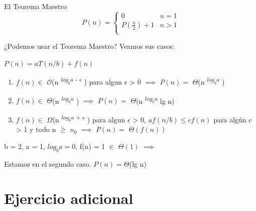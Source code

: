 \documentclass[pdf]{beamer}
\begin{document}
\begin{frame}{El Teorema Maestro}
\[ P(n) =  \begin{cases} 
    0 & n = 1 \\
    P(\frac{n}{2}) + 1 & n > 1 \\ 
   \end{cases}
 \]

 ¿Podemos usar el Teorema Maestro? Veamos sus casos:
 
 \pause
 
 \vspace{0.5em}
 
 \par{$P(n) = aT(n/b) + f(n)$}
 
 \vspace{0.5em}
 

 \begin{enumerate}
 
 [circle]
    \item $f(n) \in $  $\mathcal{O}$(n \textsuperscript{$log_b{a} $ - \(\epsilon\)  })  para algun \(\epsilon\) > 0 $\implies$ $P(n) =$ $\Theta$(n \textsuperscript{$log_b{a} $ })
    \item $f(n) \in $  $\Theta$(n \textsuperscript{$log_b{a} $ }) $\implies$ $P(n) =$ $\Theta$(n \textsuperscript{$log_b{a} $ } lg n)
    \item $f(n) \in $  $\Omega$(n \textsuperscript{$log_b{a} $ + \(\epsilon\) }) para algun \(\epsilon\) > 0, $a f(n/b) \leq c f(n)$ para algún c > 1 y todo n $\geq$ $n_0$ 
    $\implies$ $P(n) =$ $\Theta(f(n))$
 \end{enumerate}

\pause
\par{b = 2, a = 1, $log_b{a} = 0$, f(n) = 1 $\in$ $\Theta(1)$ $\implies$ }
\par{Estamos en el segundo caso. $P(n) = \Theta$(lg n)}
   

\end{frame}

\section{Ejercicio adicional}
\end{document}
